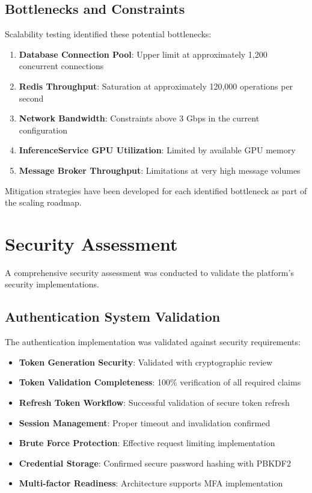 \subsection{Bottlenecks and Constraints}

Scalability testing identified these potential bottlenecks:

\begin{enumerate}
    \item \textbf{Database Connection Pool}: Upper limit at approximately 1,200 concurrent connections
    \item \textbf{Redis Throughput}: Saturation at approximately 120,000 operations per second
    \item \textbf{Network Bandwidth}: Constraints above 3 Gbps in the current configuration
    \item \textbf{InferenceService GPU Utilization}: Limited by available GPU memory
    \item \textbf{Message Broker Throughput}: Limitations at very high message volumes
\end{enumerate}

Mitigation strategies have been developed for each identified bottleneck as part of the scaling roadmap.

\section{Security Assessment}

A comprehensive security assessment was conducted to validate the platform's security implementations.

\subsection{Authentication System Validation}

The authentication implementation was validated against security requirements:

\begin{itemize}
    \item \textbf{Token Generation Security}: Validated with cryptographic review
    \item \textbf{Token Validation Completeness}: 100\% verification of all required claims
    \item \textbf{Refresh Token Workflow}: Successful validation of secure token refresh
    \item \textbf{Session Management}: Proper timeout and invalidation confirmed
    \item \textbf{Brute Force Protection}: Effective request limiting implementation
    \item \textbf{Credential Storage}: Confirmed secure password hashing with PBKDF2
    \item \textbf{Multi-factor Readiness}: Architecture supports MFA implementation
\end{itemize}


